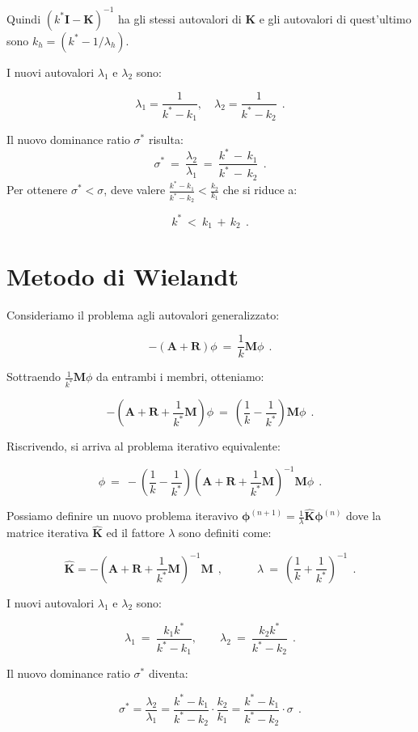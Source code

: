Quindi $(k^*\mathbf{I} - \mathbf{K})^{-1}$ ha gli stessi autovalori di $\mathbf K$ e gli autovalori di quest'ultimo sono $k_h=\left(k^*-1/\lambda_h\right)$.
 
I nuovi autovalori $\lambda_1$ e $\lambda_2$ sono:  

\[\lambda_1 = \frac{1}{k^* - k_1}, \quad \lambda_2 = \frac{1}{k^* - k_2}\ \ .\]  

Il nuovo dominance ratio $\sigma^*$ risulta:  
\[\sigma^*\ =\ \frac{\lambda_2}{\lambda_1}\ =\ \frac{k^*\, -\, k_1}{k^*\, -\, k_2}\ \ .\]  
Per ottenere $\sigma^* < \sigma$, deve valere $\frac{k^*-k_1}{k^*-k_2}<\frac{k_2}{k_1}$ che si riduce a:
  
\[k^*\ <\ k_1\, +\, k_2\ \ .\] 

%
%
% 
\section{Metodo di Wielandt}
Consideriamo il problema agli autovalori generalizzato:  

\[-(\mathbf{A} + \mathbf{R})\phi\ =\ \frac{1}{k} \mathbf{M} \phi\ \ .\]  

Sottraendo $\frac{1}{k^*}\mathbf{M}\phi$ da entrambi i membri, otteniamo:  

\[-\left(\mathbf{A} + \mathbf{R} + \frac{1}{k^*} \mathbf{M}\right) \phi\ =\ \left(\frac{1}{k} - \frac{1}{k^*}\right) \mathbf{M} \phi\ \ .\]  

Riscrivendo, si arriva al problema iterativo equivalente:  

\[\phi\ =\ -\left(\frac{1}{k} - \frac{1}{k^*}\right) \left(\mathbf{A} + \mathbf{R} + \frac{1}{k^*} \mathbf{M}\right)^{-1} \mathbf{M} \phi\ \ .\]  

Possiamo definire un nuovo problema iteravivo $\boxed{\mathbf \phi^{(n+1)} = \frac{1}{\lambda} \mathbf{\hat K} \mathbf \phi^{(n)}}$ dove la matrice iterativa $\hat{\mathbf{K}}$ ed il fattore $\lambda$ sono definiti come:  

\[\hat{\mathbf{K}} = -\left(\mathbf{A} + \mathbf{R} + \frac{1}{k^*} \mathbf{M}\right)^{-1} \mathbf{M}\ \ ,\qquad \quad \lambda\ =\ \left(\frac{1}{k}+ \frac{1}{k^*}\right)^{-1}\ \ .\]
  
I nuovi autovalori $\lambda_1$ e $\lambda_2$ sono:  

\[\lambda_1\ =\ \frac{k_1 k^*}{k^* - k_1}, \qquad \lambda_2\ =\ \frac{k_2 k^*}{k^* - k_2}\ \ .\]  

Il nuovo dominance ratio $\sigma^*$ diventa:  

\[\sigma^* = \frac{\lambda_2}{\lambda_1} = \frac{k^* - k_1}{k^* - k_2} \cdot \frac{k_2}{k_1} = \frac{k^* - k_1}{k^* - k_2} \cdot \sigma\ \ .\]  

